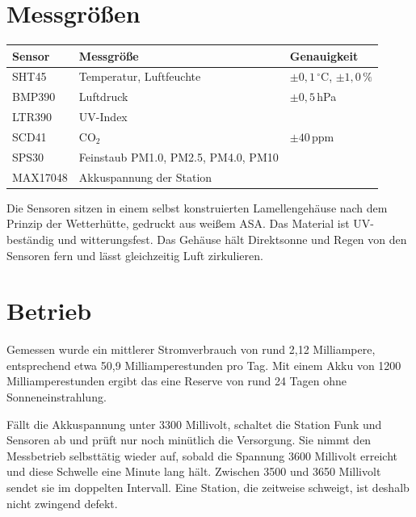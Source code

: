 \documentclass[11pt,a4paper]{scrartcl}
\begin{document}
\section*{Messgrößen}

\begin{table}[h]
  \centering
  \begin{tabularx}{\textwidth}{lLl}
    \toprule
    \textbf{Sensor} & \textbf{Messgröße} & \textbf{Genauigkeit} \\
    \midrule
    SHT45    & Temperatur, Luftfeuchte                          & $\pm0{,}1\,^\circ$C, $\pm1{,}0\,\%$ \\
    BMP390   & Luftdruck                                        & $\pm0{,}5$\,hPa \\
    LTR390   & UV\hspace{0pt}-Index                             & \\
    SCD41    & CO$_2$                                           & $\pm40$\,ppm \\
    SPS30    & Feinstaub PM1.0, PM2.5, PM4.0, PM10              & \\
    MAX17048 & Akkuspannung der Station                         & \\
    \bottomrule
  \end{tabularx}
\end{table}

Die Sensoren sitzen in einem selbst konstruierten Lamellengehäuse nach dem Prinzip der Wetterhütte, gedruckt aus weißem ASA. Das Material ist UV\hspace{0pt}-beständig und witterungsfest. Das Gehäuse hält Direktsonne und Regen von den Sensoren fern und lässt gleichzeitig Luft zirkulieren.

\section*{Betrieb}

Gemessen wurde ein mittlerer Stromverbrauch von rund 2,12 Milliampere, entsprechend etwa 50,9 Milliamperestunden pro Tag. Mit einem Akku von 1200 Milliamperestunden ergibt das eine Reserve von rund 24 Tagen ohne Sonneneinstrahlung.

Fällt die Akkuspannung unter 3300 Millivolt, schaltet die Station Funk und Sensoren ab und prüft nur noch minütlich die Versorgung. Sie nimmt den Messbetrieb selbsttätig wieder auf, sobald die Spannung 3600 Millivolt erreicht und diese Schwelle eine Minute lang hält. Zwischen 3500 und 3650 Millivolt sendet sie im doppelten Intervall. Eine Station, die zeitweise schweigt, ist deshalb nicht zwingend defekt.
\end{document}
